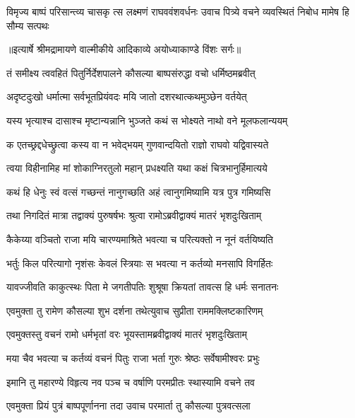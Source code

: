 \fourlineindentedshloka
{विमृज्य बाष्पं परिसान्त्व्य चासकृ}
{त्स लक्ष्मणं राघववंशवर्धनः}
{उवाच पित्र्ये वचने व्यवस्थितं}
{ निबोध मामेष हि सौम्य सत्पथः} %


{॥इत्यार्षे श्रीमद्रामायणे वाल्मीकीये आदिकाव्ये अयोध्याकाण्डे विंशः सर्गः॥}


\twolineshloka
{तं समीक्ष्य त्ववहितं पितुर्निर्देशपालने}
{कौसल्या बाष्पसंरुद्धा वचो धर्मिष्ठमब्रवीत्} %

\twolineshloka
{अदृष्टदुःखो धर्मात्मा सर्वभूतप्रियंवदः}
{मयि जातो दशरथात्कथमुञ्छेन वर्तयेत्} %

\twolineshloka
{यस्य भृत्याश्च दासाश्च मृष्टान्यन्नानि भुञ्जते}
{कथं स भोक्ष्यते नाथो वने मूलफलान्ययम्} %

\twolineshloka
{क एतच्छ्रद्दधेच्छ्रुत्वा कस्य वा न भवेद्भयम्}
{गुणवान्दयितो राज्ञो राघवो यद्विवास्यते} %

\twolineshloka
{त्वया विहीनामिह मां शोकाग्निरतुलो महान्}
{प्रधक्ष्यति यथा कक्षं चित्रभानुर्हिमात्यये} %

\twolineshloka
{कथं हि धेनुः स्वं वत्सं गच्छन्तं नानुगच्छति}
{अहं त्वानुगमिष्यामि यत्र पुत्र गमिष्यसि} %

\twolineshloka
{तथा निगदितं मात्रा तद्वाक्यं पुरुषर्षभः}
{श्रुत्वा रामोऽब्रवीद्वाक्यं मातरं भृशदुःखिताम्} %

\twolineshloka
{कैकेय्या वञ्चितो राजा मयि चारण्यमाश्रिते}
{भवत्या च परित्यक्तो न नूनं वर्तयिष्यति} %

\twolineshloka
{भर्तुः किल परित्यागो नृशंसः केवलं स्त्रियाः}
{स भवत्या न कर्तव्यो मनसापि विगर्हितः} %

\twolineshloka
{यावज्जीवति काकुत्स्थः पिता मे जगतीपतिः}
{शुश्रूषा क्रियतां तावत्स हि धर्मः सनातनः} %

\twolineshloka
{एवमुक्ता तु रामेण कौसल्या शुभ दर्शना}
{तथेत्युवाच सुप्रीता राममक्लिष्टकारिणम्} %

\twolineshloka
{एवमुक्तस्तु वचनं रामो धर्मभृतां वरः}
{भूयस्तामब्रवीद्वाक्यं मातरं भृशदुःखिताम्} %

\twolineshloka
{मया चैव भवत्या च कर्तव्यं वचनं पितुः}
{राजा भर्ता गुरुः श्रेष्ठः सर्वेषामीश्वरः प्रभुः} %

\twolineshloka
{इमानि तु महारण्ये विहृत्य नव पञ्च च}
{वर्षाणि परमप्रीतः स्थास्यामि वचने तव} %

\twolineshloka
{एवमुक्ता प्रियं पुत्रं बाष्पपूर्णानना तदा}
{उवाच परमार्ता तु कौसल्या पुत्रवत्सला} %

